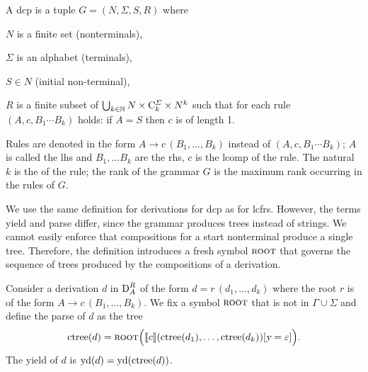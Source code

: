 \documentclass[../document.tex]{subfiles}
\begin{document}
    \begin{definition}
        A \gls{dcp} is a tuple \(G=(N, \varSigma, S, R)\) where
        \begin{compactenum}[(i)]
            \item \(N\) is a finite set (\glspl{nonterminal}),
            \item \(\varSigma\) is an alphabet (\glspl{terminal}),
            \item \(S \in N\) (initial non-terminal),
            \item \(R\) is a finite subset of \(\bigcup_{k \in \mathbb{N}} N \times \mathrm{C}^\varSigma_k \times N^k\) such that for each rule \((A, c, B_1\cdots B_k)\) holds: if \(A = S\) then \(c\) is of length 1.
        \end{compactenum}

        Rules are denoted in the form \(A \to c\,(B_1, \ldots, B_k)\) instead of \((A, c, B_1 \cdots B_k)\); \(A\) is called the \gls{lhs} and \(B_1, \ldots B_k\) are the \gls{rhs}, \(c\) is the \gls*{lcomp} of the \gls*{rule}.
        The natural \(k\) is the  of the rule; the \gls*{rank} of the grammar \(G\) is the maximum rank occurring in the rules of \(G\).
    \end{definition}


    We use the same definition for derivations for \gls{dcp} as for \gls{lcfrs}.
    However, the terms yield and parse differ, since the grammar produces trees instead of strings.
    We cannot easily enforce that compositions for a start nonterminal produce a single tree.
    Therefore, the definition introduces a fresh symbol \(\textsc{root}\) that governs the sequence of trees produced by the compositions of a derivation.

    \begin{definition}
        Consider a derivation \(d\) in \(\operatorname{D}^R_A\) of the form \(d = r\,(d_1, \ldots, d_k)\) where the root \(r\) is of the form \(A \to c\,(B_1, \ldots, B_k)\).
        We fix a symbol \(\textsc{root}\) that is not in \(\varGamma \cup \varSigma\) and define the parse of \(d\) as the tree \[
            \operatorname{ctree}(d) = \textsc{root}\Big( \llbracket c\rrbracket(\operatorname{ctree}(d_1),\ldots,\operatorname{ctree}(d_k))[\textsl{y}=\varepsilon]\Big) \text{.}
        \]
        The yield of \(d\) is \(\operatorname{yd}(d) = \operatorname{yd}(\operatorname{ctree}(d))\).
    \end{definition}
\end{document}
